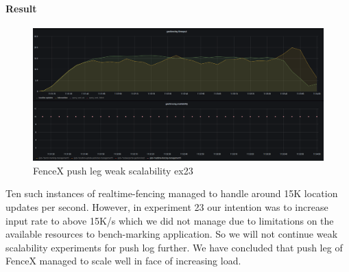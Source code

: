 \documentclass[a4]{report}
\begin{document}
    \paragraph{Result}
    \begin{figure}[ht]
        \caption{FenceX push leg weak scalability ex23}
        \label{fig:ex23}
        \includegraphics[scale=0.4]{images/evaluation/ex23-benchmarking-ongoing-2per2sec.png}
    \end{figure}
    Ten such instances of realtime-fencing managed to handle around 15K location updates per second.
    However, in experiment 23 our intention was to increase input rate to above 15K/s which we did not manage due to
    limitations on the available resources to bench-marking application.
    So we will not continue weak scalability experiments for push log further.
    We have concluded that push leg of FenceX managed to scale well in face of increasing load.



    \nocite{*}
    
    
\end{document}

